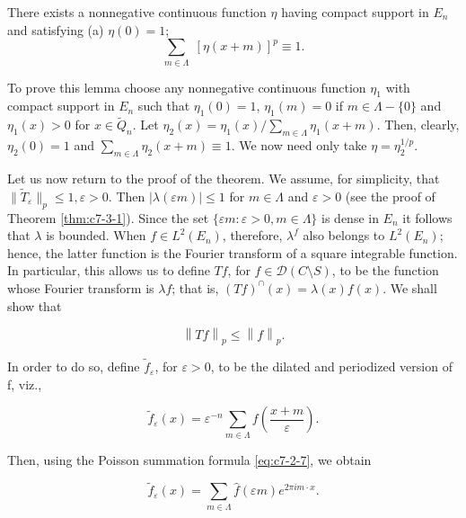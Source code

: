 \begin{lemma}
\label{lem:c7-3-21}
There exists a nonnegative continuous function $\eta$ having compact support in $E_n$ and satisfying
(a) $\eta(0) = 1$;
\begin{equation}
\tag{b}
\textstyle\sum_{m\in\Lambda}\;[\eta(x+m)]^{p}\equiv1.
\end{equation}

\end{lemma}

To prove this lemma choose any nonnegative continuous function $\eta_1$ with compact support in $E_n$ such that $\eta_1(0) = 1$, $\eta_1(m) = 0$ if $m \in \Lambda - \{0\}$ and $\eta_1(x) > 0$ for $x \in \widetilde{Q}_n$. Let $\eta_2(x) = \eta_1(x)/\sum_{m \in \Lambda} \eta_1(x + m)$. Then, clearly, $\eta_2(0) = 1$ and $\sum_{m \in \Lambda} \eta_2(x + m) \equiv 1$. We now need only take $\eta = \eta_2^{1/p}$.

Let us now return to the proof of the theorem. We assume, for simplicity, that $\|\widetilde{T}_\varepsilon\|_p \leq 1, \varepsilon > 0$. Then $|\lambda(\varepsilon m)| \leq 1$ for $m \in \Lambda$ and $\varepsilon > 0$ (see the proof of Theorem \ref{thm:c7-3-1}). Since the set $\{\varepsilon m\colon \varepsilon > 0, m \in \Lambda\}$ is dense in $E_n$ it follows that $\lambda$ is bounded. When $f \in L^2(E_n)$, therefore, $\lambda^f$ also belongs to $L^2(E_n)$; hence, the latter function is the Fourier transform of a square integrable function. In particular, this allows us to define $Tf$, for $f \in \mathcal{D} (C \setminus S)$, to be the function whose Fourier transform is $\lambda f$; that is, $(Tf)^\cap(x) = \lambda(x)f(x)$. We shall show that

\begin{equation}\label{eq:c7-3-22}
\left\|T f\right\|_{p}\leq\left\|f\right\|_{p}.
\end{equation}

In order to do so, define $\tilde{f}_{\varepsilon}$, for $\varepsilon > 0$, to be the dilated and periodized version of f, viz.,

\[
\tilde{f}_{\varepsilon}(x)=\varepsilon^{-n}\sum_{m\in\Lambda}f\left(\frac{x+m}{\varepsilon}\right).
\]

Then, using the Poisson summation formula \eqref{eq:c7-2-7}, we obtain

\begin{equation}\label{eq:c7-3-23}
\tilde{f}_{\varepsilon}(x)=\sum_{m\in\Lambda}\hat{f}(\varepsilon m)e^{2\pi i m\cdot x}.
\end{equation}

